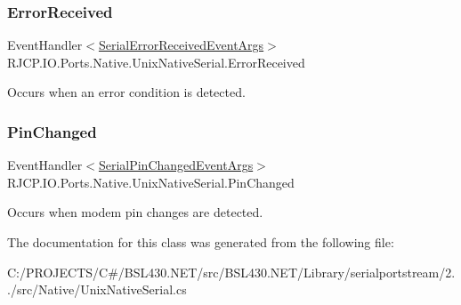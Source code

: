 \mbox{\label{class_r_j_c_p_1_1_i_o_1_1_ports_1_1_native_1_1_unix_native_serial_a9f76774feeee675c6b5ea66c75b8eb14}} 
\subsubsection{\texorpdfstring{ErrorReceived}{ErrorReceived}}
{\footnotesize\ttfamily Event\+Handler$<$\mbox{\hyperlink{class_r_j_c_p_1_1_i_o_1_1_ports_1_1_serial_error_received_event_args}{Serial\+Error\+Received\+Event\+Args}}$>$ R\+J\+C\+P.\+I\+O.\+Ports.\+Native.\+Unix\+Native\+Serial.\+Error\+Received}



Occurs when an error condition is detected. 

\mbox{\label{class_r_j_c_p_1_1_i_o_1_1_ports_1_1_native_1_1_unix_native_serial_a076b209f454527a7f38615f20180fae1}} 
\subsubsection{\texorpdfstring{PinChanged}{PinChanged}}
{\footnotesize\ttfamily Event\+Handler$<$\mbox{\hyperlink{class_r_j_c_p_1_1_i_o_1_1_ports_1_1_serial_pin_changed_event_args}{Serial\+Pin\+Changed\+Event\+Args}}$>$ R\+J\+C\+P.\+I\+O.\+Ports.\+Native.\+Unix\+Native\+Serial.\+Pin\+Changed}



Occurs when modem pin changes are detected. 



The documentation for this class was generated from the following file\+:\begin{DoxyCompactItemize}
\item 
C\+:/\+P\+R\+O\+J\+E\+C\+T\+S/\+C\#/\+B\+S\+L430.\+N\+E\+T/src/\+B\+S\+L430.\+N\+E\+T/\+Library/serialportstream/2../src/\+Native/Unix\+Native\+Serial.\+cs\end{DoxyCompactItemize}
